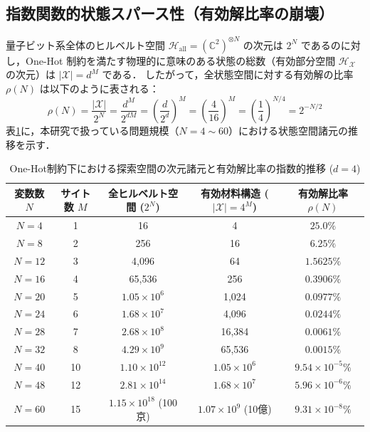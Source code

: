 \documentclass[11pt,a4paper]{ltjsarticle}
\begin{document}
\subsection{指数関数的状態スパース性（有効解比率の崩壊）}
量子ビット系全体のヒルベルト空間 $\mathcal{H}_{\mathrm{all}} = (\mathbb{C}^2)^{\otimes N}$ の次元は $2^N$ であるのに対し，One-Hot 制約を満たす物理的に意味のある状態の総数（有効部分空間 $\mathcal{H}_{\mathcal{X}}$ の次元）は $|\mathcal{X}| = d^M$ である．
したがって，全状態空間に対する有効解の比率 $\rho(N)$ は以下のように表される：
\begin{equation}
\rho(N) = \frac{|\mathcal{X}|}{2^N} = \frac{d^M}{2^{d M}} = \left( \frac{d}{2^d} \right)^M = \left( \frac{4}{16} \right)^M = \left( \frac{1}{4} \right)^{N/4} = 2^{-N/2}
\end{equation}
表\ref{tab:dimension_scaling}に，本研究で扱っている問題規模（$N=4 \sim 60$）における状態空間諸元の推移を示す．

\begin{table}[H]
\centering
\caption{One-Hot制約下における探索空間の次元諸元と有効解比率の指数的推移 ($d=4$)}\label{tab:dimension_scaling}
\vspace{1mm}
\small
\renewcommand{\arraystretch}{1.15}
\begin{tabular}{ccccc}
\toprule
\textbf{変数数 $N$} & \textbf{サイト数 $M$} & \textbf{全ヒルベルト空間 ($2^N$)} & \textbf{有効材料構造 ($|\mathcal{X}| = 4^M$)} & \textbf{有効解比率 $\rho(N)$} \\
\midrule
$N=4$  & 1  & 16 & 4 & $25.0\%$ \\
$N=8$  & 2  & 256 & 16 & $6.25\%$ \\
$N=12$ & 3  & 4,096 & 64 & $1.5625\%$ \\
$N=16$ & 4  & 65,536 & 256 & $0.3906\%$ \\
$N=20$ & 5  & $1.05 \times 10^6$ & 1,024 & $0.0977\%$ \\
$N=24$ & 6  & $1.68 \times 10^7$ & 4,096 & $0.0244\%$ \\
$N=28$ & 7  & $2.68 \times 10^8$ & 16,384 & $0.0061\%$ \\
$N=32$ & 8  & $4.29 \times 10^9$ & 65,536 & $0.0015\%$ \\
\midrule
$N=40$ & 10 & $1.10 \times 10^{12}$ & $1.05 \times 10^6$ & $9.54 \times 10^{-5}\%$ \\
$N=48$ & 12 & $2.81 \times 10^{14}$ & $1.68 \times 10^7$ & $5.96 \times 10^{-6}\%$ \\
$N=60$ & 15 & $1.15 \times 10^{18}$ (100京) & $1.07 \times 10^9$ (10億) & $9.31 \times 10^{-8}\%$ \\
\bottomrule
\end{tabular}
\end{table}
\end{document}
